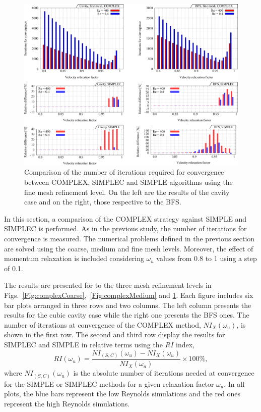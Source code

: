 \documentclass[final,3p,times,11pt,onecolumn]{myElsarticle}
\numberwithin{equation}{section}
\begin{document}
\begin{figure}[t!]
\centering
\includegraphics[width=15cm]{fig/Results/complexFine.pdf}
\caption{Comparison of the number of iterations required for convergence between COMPLEX, SIMPLEC and SIMPLE algorithms using the fine mesh refinement level. On the left are the results of the cavity case and on the right, those respective to the BFS.}
\label{Fig:complexFine}
\end{figure}
In this section, a comparison of the COMPLEX strategy against SIMPLE and SIMPLEC is performed.
As in the previous study, the number of iterations for convergence is measured. The numerical problems defined in the previous section are solved using the coarse, medium and fine mesh levels. Moreover, the effect of momentum relaxation is included considering $\omega_u$ values from 0.8 to 1 using a step of 0.1.


The results are presented for to the three mesh refinement levels in Figs.~\ref{Fig:complexCoarse},~\ref{Fig:complexMedium} and \ref{Fig:complexFine}. Each figure includes six bar plots arranged in three rows and two columns. The left column presents the results for the cubic cavity case while the right one presents the BFS ones. The number of iterations at convergence of the COMPLEX method, $NI_X(\omega_u)$, is shown in the first row. The second and third row display the results for SIMPLEC and SIMPLE in relative terms using the $RI$ index,
\begin{equation}
RI(\omega_u)
=
\dfrac
{NI_{(S,C)}(\omega_u) - NI_X(\omega_u)}
{NI_X(\omega_u)}
\times
100\%,
\end{equation}
where $NI_{(S,C)}(\omega_u)$ is the absolute number of iterations needed at convergence for the SIMPLE or SIMPLEC methods for a given relaxation factor $\omega_u$. 
In all plots, the blue bars represent the low Reynolds simulations and the red ones represent the high Reynolds simulations.
\end{document}
